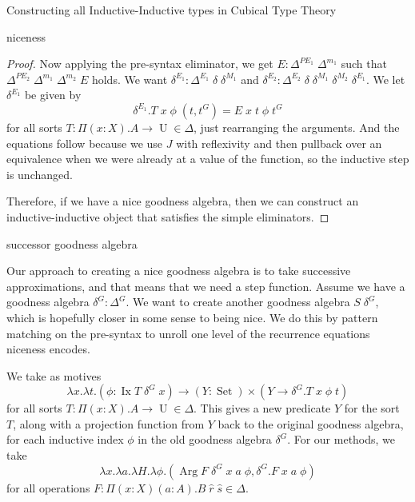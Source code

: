 \documentclass[runningheads]{llncs}
\DeclareMathOperator{\USet}{Set}
\DeclareMathOperator{\UU}{U}
\DeclareMathOperator{\Arg}{Arg}
\DeclareMathOperator{\Ix}{Ix}
\begin{document}
{\begin{section}{Constructing all Inductive-Inductive types in Cubical Type Theory}
\begin{subsection}{niceness}
\begin{proof}
Now applying the pre-syntax eliminator, we get $E : \Delta^{PE_1}\;\Delta^{m_1}$ such that $\Delta^{PE_2}\;\Delta^{m_1}\;\Delta^{m_2}\;E$ holds. We want $\delta^{E_1} : \Delta^{E_1}\;\delta\;\delta^{M_1}$ and $\delta^{E_2} : \Delta^{E_2}\;\delta\;\delta^{M_1}\;\delta^{M_2}\;\delta^{E_1}$.
We let $\delta^{E_1}$ be given by \[\delta^{E_1}.T\;x\;\phi\;(t,t^G) = E\;x\;t\;\phi\;t^G\] for all sorts $T : \Pi(x : X).A\to\UU\in\Delta$, just rearranging the arguments. And the equations follow because we use $J$ with reflexivity and then pullback over an equivalence when we were already at a value of the function, so the inductive step is unchanged.

Therefore, if we have a nice goodness algebra, then we can construct an inductive-inductive object that satisfies the simple eliminators.
\end{proof}

\end{subsection}
\begin{subsection}{successor goodness algebra}\label{successor-alg}

Our approach to creating a nice goodness algebra is to take successive approximations, and that means that we need a step function. Assume we have a goodness algebra $\delta^G : \Delta^G$. We want to create another goodness algebra $S\;\delta^G$, which is hopefully closer in some sense to being nice. We do this by pattern matching on the pre-syntax to unroll one level of the recurrence equations niceness encodes.

We take as motives \[\lambda x.\lambda t.(\phi : \Ix T \;\delta^G\;x) \to (Y : \USet)\times (Y \to \delta^G.T\;x\;\phi\;t)\] for all sorts $T : \Pi(x : X).A \to \UU \in\Delta$. This gives a new predicate $Y$ for the sort $T$, along with a projection function from $Y$ back to the original goodness algebra, for each inductive index $\phi$ in the old goodness algebra $\delta^G$.
For our methods, we take \[\lambda x.\lambda a.\lambda H.\lambda \phi. (\Arg F\;\delta^G\;x\;a\;\phi , \delta^G.F\;x\;a\;\phi)\] for all operations $F : \Pi(x : X)(a : A).B\;\hat{r}\;\hat{s}\in\Delta$. 


\end{subsection}
\end{section}}
\end{document}
